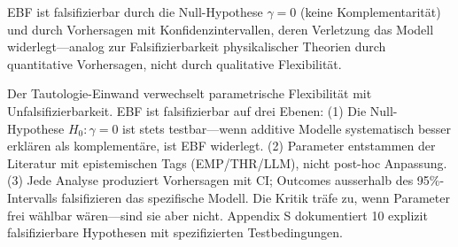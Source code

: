 \begin{tcolorbox}[colback=green!5!white, colframe=green!75!black,
    title=W1-$\mathcal{W}$-K: Kurz (Wissenschaft)]

EBF ist falsifizierbar durch die Null-Hypothese $\gamma = 0$ (keine Komplementarität) und durch Vorhersagen mit Konfidenzintervallen, deren Verletzung das Modell widerlegt---analog zur Falsifizierbarkeit physikalischer Theorien durch quantitative Vorhersagen, nicht durch qualitative Flexibilität.

\end{tcolorbox}

\begin{tcolorbox}[colback=green!5!white, colframe=green!75!black,
    title=W1-$\mathcal{W}$-M: Mittel (Wissenschaft)]

Der Tautologie-Einwand verwechselt parametrische Flexibilität mit Unfalsifizierbarkeit. EBF ist falsifizierbar auf drei Ebenen: (1) Die Null-Hypothese $H_0: \gamma = 0$ ist stets testbar---wenn additive Modelle systematisch besser erklären als komplementäre, ist EBF widerlegt. (2) Parameter entstammen der Literatur mit epistemischen Tags (EMP/THR/LLM), nicht post-hoc Anpassung. (3) Jede Analyse produziert Vorhersagen mit CI; Outcomes ausserhalb des 95\%-Intervalls falsifizieren das spezifische Modell. Die Kritik träfe zu, wenn Parameter frei wählbar wären---sind sie aber nicht. Appendix S dokumentiert 10 explizit falsifizierbare Hypothesen mit spezifizierten Testbedingungen.

\end{tcolorbox}

